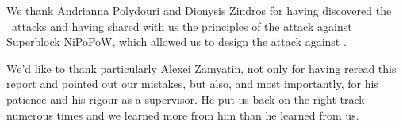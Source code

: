 We thank Andrianna Polydouri and Dionysis Zindros for having discovered the \cs\ attacks and having shared with us the principles of the attack against Superblock NiPoPoW, which allowed us to design the attack against \FC.

We'd like to thank particularly Alexei Zamyatin, not only for having reread this report and pointed out our mistakes, but also, and most importantly, for his patience and his rigour as a supervisor. He put us back on the right track numerous times and we learned more from him than he learned from us.